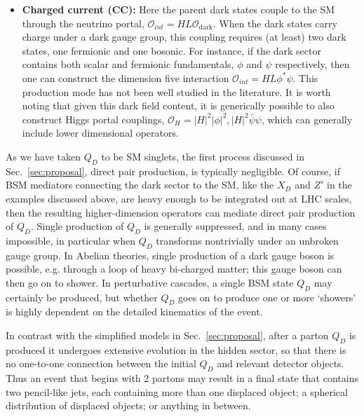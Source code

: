 \begin{itemize}
\item {\bf Charged current (CC):} Here the parent dark states couple to the SM through the neutrino portal, $\mathcal{O}_{int}=HL \mathcal{O}_{\mathrm{dark}}$. When the dark states carry charge under a dark gauge group, this coupling requires (at least) two dark states, one fermionic and one bosonic. For instance, if the dark sector contains both scalar and fermionic fundamentals, $\phi$ and $\psi$ respectively, then one can construct the dimension five interaction $\mathcal{O}_{int} = HL\phi^* \psi$. This production mode has not been well studied in the literature. It is worth noting that given this dark field content, it is generically possible to also construct Higgs portal couplings, $\mathcal{O}_H = |H| ^ 2 |\phi|^2, |H|^2\bar\psi\psi$, which can generally include lower dimensional operators.

\end{itemize}

As we have taken $Q_D$ to be SM singlets, the first process discussed in Sec.~\ref{sec:proposal}, direct pair production, is typically negligible. Of course, if BSM mediators connecting the dark sector to the SM, like the $X_D$ and $Z'$ in the examples discussed above, are heavy enough to be integrated out at LHC scales, then the resulting higher-dimension operators can mediate direct pair production of $Q_D$. Single production of $Q_D$ is generally suppressed, and in many cases impossible, in particular when $Q_D$ transforms nontrivially under an unbroken gauge group. In Abelian theories, single production of a dark gauge boson is possible, e.g. through a loop of heavy bi-charged matter; this gauge boson can then go on to shower. In perturbative cascades, a single BSM state $Q_D$ may certainly be produced, but whether $Q_D$ goes on to produce one or more `showers' is highly dependent on the detailed kinematics of the event.

In contrast with the simplified models in Sec.~\ref{sec:proposal}, after a parton $Q_D$ is produced it undergoes extensive evolution in the hidden sector, so that there is no one-to-one connection between the initial $Q_D$ and relevant detector objects. Thus an event that begins with 2 partons may result in a final state that contains two pencil-like jets, each containing more than one displaced object; a spherical distribution of displaced objects; or anything in between.


